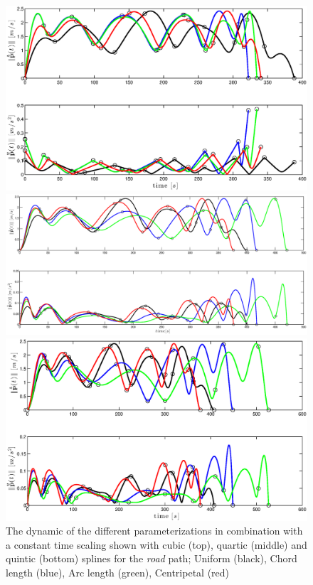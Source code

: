 \begin{figure}[H]
  \begin{minipage}[t]{0.9\textwidth}
    \includegraphics[width = \textwidth]{graphics/Parameterization3_road_vel_acc.eps}
  \end{minipage}
  \vfill
    \begin{minipage}[t]{0.9\textwidth}
    \includegraphics[width = \textwidth]{graphics/Parameterization4_road_vel_acc.eps}
  \end{minipage}
  \vfill
    \begin{minipage}[t]{0.9\textwidth}
    \includegraphics[width = \textwidth]{graphics/Parameterization5_road_vel_acc.eps}
  \end{minipage}
  \caption{The dynamic of the different parameterizations in combination with a constant time scaling shown with cubic (top), quartic (middle) and quintic (bottom) splines for the \textit{road} path; Uniform (black), Chord length (blue), Arc length (green), Centripetal (red)}
  \label{fig:parameterization_cqq}
\end{figure}

